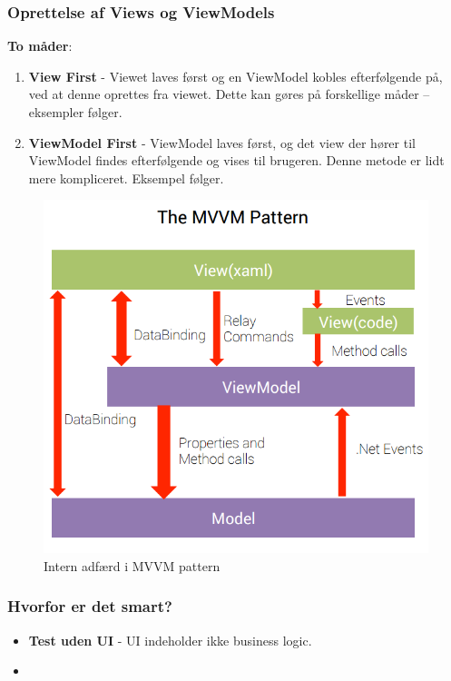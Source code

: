 \subsubsection{Oprettelse af Views og ViewModels}
\textbf{To måder}:
\begin{enumerate}
	\item \textbf{View First} - Viewet laves først og en ViewModel kobles efterfølgende på, ved at denne oprettes fra viewet. Dette kan gøres på forskellige måder – eksempler følger.
	\item \textbf{ViewModel First} - ViewModel laves først, og det view der hører til ViewModel findes efterfølgende og vises til brugeren. Denne metode er lidt mere kompliceret. Eksempel følger.
\end{enumerate}
\begin{figure}[H]
\centering
\includegraphics[width=0.7\linewidth]{figs/MVVM/mvvmPatternComplex}
\caption{Intern adfærd i MVVM pattern}
\label{fig:mvvmPatternComplex}
\end{figure}


\subsubsection{Hvorfor er det smart?}

\begin{itemize}
	\item \textbf{Test uden UI} - UI indeholder ikke business logic.
	\item 
\end{itemize}




